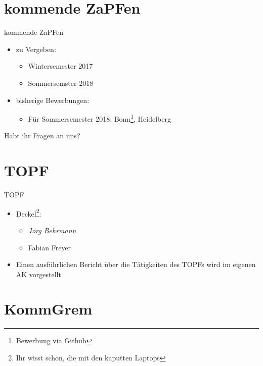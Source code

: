 \documentclass[compress, aspectratio=169]{beamer}
\begin{document}
\section{kommende ZaPFen}
\begin{frame}{kommende ZaPFen}
	\begin{itemize}
		\item zu Vergeben:
			\begin{itemize}
				\item Wintersemester 2017
				\item Sommersemster 2018
			\end{itemize}
		\item bisherige Bewerbungen:
			\begin{itemize}
				\item Für Sommersemester 2018: Bonn\footnote{Bewerbung via Github}, Heidelberg
			\end{itemize}
	\end{itemize}
\end{frame}

\begin{frame}[plain]
	\begin{center}
		\Huge Habt ihr Fragen an uns?
	\end{center}
\end{frame}

\section{TOPF}
\begin{frame}{TOPF}
	\begin{itemize}
		\item[] Deckel\footnote{Ihr wisst schon, die mit den kaputten Laptops}:
			\begin{itemize}
				\item \emph{Jörg Behrmann}
				\item Fabian Freyer
			\end{itemize}
		\item[] Einen ausführlichen Bericht über die Tätigkeiten des TOPFs wird im eigenen AK vorgestellt
	\end{itemize}
\end{frame}

\section{KommGrem}
\end{document}
